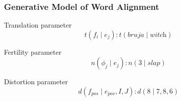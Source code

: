\begin{frame}
\frametitle{Generative Model of Word Alignment}
\begin{block}{Translation parameter}
\[ t(f_i \mid e_j) : t(\textit{bruja} \mid \textit{witch}) \]
\end{block}\pause
\begin{block}{Fertility parameter}
\[ n(\phi_j \mid e_j) : n(3 \mid \textit{slap}) \]
\end{block}\pause
\begin{block}{Distortion parameter}
\[ d(f_{\textit{pos}} \mid e_{\textit{pos}}, I, J) : d(8 \mid 7, 8, 6) \]
\end{block}
\end{frame}




